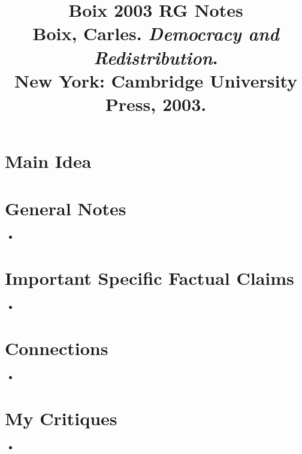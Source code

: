 \documentclass[12pt]{article}
\title{\textbf{Boix 2003 RG Notes}\\
\large Boix, Carles. \textit{Democracy and Redistribution}.\\
New York: Cambridge University Press, 2003.}
\author{}
\date{}
\begin{document}
\maketitle

\section{Main Idea}



\section{General Notes}

\begin{itemize}[leftmargin=*, itemsep=4pt]
    \item
\end{itemize}


\section{Important Specific Factual Claims}

\begin{itemize}[leftmargin=*, itemsep=4pt]
    \item
\end{itemize}


\section{Connections}

\begin{itemize}[leftmargin=*, itemsep=4pt]
    \item
\end{itemize}


\section{My Critiques}

\begin{itemize}[leftmargin=*, itemsep=4pt]
    \item
\end{itemize}
\end{document}
